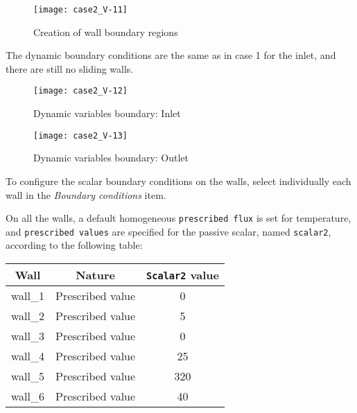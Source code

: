\begin{figure}[h!]
\begin{center}
\texttt{[image: case2\_V-11]}
\caption{Creation of wall boundary regions}
\label{fig152_e2}
\end{center}
\end{figure}


\newpage
The dynamic boundary conditions are the same as in case 1 for the inlet, and
there are still no sliding walls.\\

\begin{figure}[h!]
\begin{center}
\texttt{[image: case2\_V-12]}
\caption{Dynamic variables boundary: Inlet}
\end{center}
\end{figure}
\newpage

\begin{figure}[h!]
\begin{center}
\texttt{[image: case2\_V-13]}
\caption{Dynamic variables boundary: Outlet}
\end{center}
\end{figure}

\newpage
To configure the scalar boundary conditions on the walls, select individually each
wall in the {\itshape Boundary conditions} item.

On all the walls, a default homogeneous \texttt{prescribed flux} is set for temperature,
and \texttt{prescribed values} are
specified for the passive scalar, named \texttt{scalar2}, according to the following table:\\
\begin{center}
\begin{tabular}{|c|c|c|}
\hline
Wall & Nature & \texttt{Scalar2} value \\
\hline
\hline
wall\_1 & Prescribed value  & 0 \\
\hline
wall\_2 & Prescribed value  & 5 \\
\hline
wall\_3 & Prescribed value  & 0 \\
\hline
wall\_4 & Prescribed value  & 25 \\
\hline
wall\_5 & Prescribed value  & 320 \\
\hline
wall\_6 & Prescribed value  & 40 \\
\hline
\end{tabular}
\end{center}

